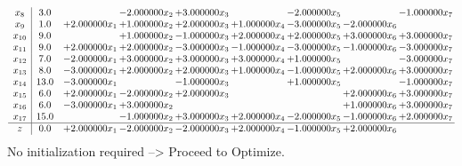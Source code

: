 \documentclass[10pt]{article}
\begin{document}
\[\begin{array}{c| c c@{\hskip 2pt} c@{\hskip 2pt} c@{\hskip 2pt} c@{\hskip 2pt} c@{\hskip 2pt} c@{\hskip 2pt} c@{\hskip 2pt} }
 x_{8}   &  3.0  &   & -2.000000 x_{2} & + 3.000000 x_{3} &   & -2.000000 x_{5} &   & -1.000000 x_{7}\\
 x_{9}   &  1.0 & + 2.000000 x_{1} & + 1.000000 x_{2} & + 2.000000 x_{3} & + 1.000000 x_{4} & -3.000000 x_{5} & -2.000000 x_{6} &   \\
 x_{10}   &  9.0  &   & + 1.000000 x_{2} & -1.000000 x_{3} & + 2.000000 x_{4} & + 2.000000 x_{5} & + 3.000000 x_{6} & + 3.000000 x_{7}\\
 x_{11}   &  9.0 & + 2.000000 x_{1} & + 2.000000 x_{2} & -3.000000 x_{3} & -1.000000 x_{4} & -3.000000 x_{5} & -1.000000 x_{6} & -3.000000 x_{7}\\
 x_{12}   &  7.0 & -2.000000 x_{1} & + 3.000000 x_{2} & + 3.000000 x_{3} & + 3.000000 x_{4} & + 1.000000 x_{5} &   & -3.000000 x_{7}\\
 x_{13}   &  8.0 & -3.000000 x_{1} & + 2.000000 x_{2} & + 2.000000 x_{3} & + 1.000000 x_{4} & -1.000000 x_{5} & + 2.000000 x_{6} & + 3.000000 x_{7}\\
 x_{14}   &  13.0 & -3.000000 x_{1} &   & -1.000000 x_{3} &   & + 1.000000 x_{5} &   & -1.000000 x_{7}\\
 x_{15}   &  6.0 & + 2.000000 x_{1} & -2.000000 x_{2} & + 2.000000 x_{3} &    &   & + 2.000000 x_{6} & + 3.000000 x_{7}\\
 x_{16}   &  6.0 & -3.000000 x_{1} & + 3.000000 x_{2} &    &    &   & + 1.000000 x_{6} & + 3.000000 x_{7}\\
 x_{17}   &  15.0  &   & -1.000000 x_{2} & + 3.000000 x_{3} & + 2.000000 x_{4} & -2.000000 x_{5} & -1.000000 x_{6} & + 2.000000 x_{7}\\
\hline
z    &  0.0 & + 2.000000 x_{1} & -2.000000 x_{2} & -2.000000 x_{3} & + 2.000000 x_{4} & -1.000000 x_{5} & + 2.000000 x_{6} &   \\
\end{array}\]
No initialization required --> Proceed to Optimize. 
\end{document}

